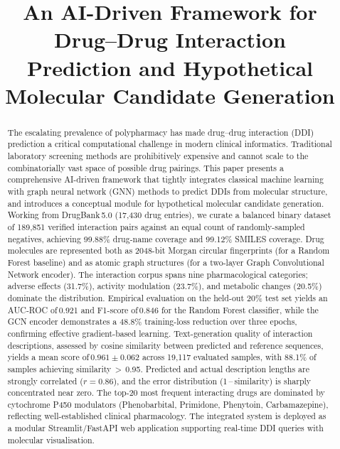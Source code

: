 \documentclass[conference]{IEEEtran}
\title{An AI-Driven Framework for Drug--Drug Interaction\\
Prediction and Hypothetical Molecular Candidate Generation}
\author{%
\IEEEauthorblockN{Ketan Tripathi,\enspace Amrit Lal Saket,\enspace
                  Prabhat Kumar Prince,\enspace Mehtab Singh Rathore}
\IEEEauthorblockA{%
  \textit{Guided by Dr.~Swapan Maiti, Assistant Professor}\\
  Department of Computer Science and Engineering\\
  Visvesvaraya National Institute of Technology (VNIT), Nagpur\,--\,440\,010, India
}}
\begin{document}
\maketitle

\begin{abstract}
The escalating prevalence of polypharmacy has made drug--drug interaction (DDI) prediction
a critical computational challenge in modern clinical informatics. Traditional laboratory
screening methods are prohibitively expensive and cannot scale to the combinatorially vast
space of possible drug pairings. This paper presents a comprehensive AI-driven framework
that tightly integrates classical machine learning with graph neural network (GNN) methods to
predict DDIs from molecular structure, and introduces a conceptual module for hypothetical
molecular candidate generation. Working from DrugBank\,5.0 (17,430 drug entries), we curate
a balanced binary dataset of 189,851 verified interaction pairs against an equal count of
randomly-sampled negatives, achieving 99.88\% drug-name coverage and 99.12\% SMILES
coverage. Drug molecules are represented both as 2048-bit Morgan circular fingerprints
(for a Random Forest baseline) and as atomic graph structures (for a two-layer Graph
Convolutional Network encoder). The interaction corpus spans nine pharmacological
categories; adverse effects (31.7\%), activity modulation (23.7\%), and metabolic changes
(20.5\%) dominate the distribution. Empirical evaluation on the held-out 20\% test set
yields an AUC-ROC of\,0.921 and F1-score of\,0.846 for the Random Forest classifier, while
the GCN encoder demonstrates a 48.8\% training-loss reduction over three epochs,
confirming effective gradient-based learning. Text-generation quality of interaction
descriptions, assessed by cosine similarity between predicted and reference sequences, yields
a mean score of\,$0.961 \pm 0.062$ across 19,117 evaluated samples, with 88.1\% of samples
achieving similarity\,$>$\,0.95. Predicted and actual description lengths are strongly
correlated ($r = 0.86$), and the error distribution (1\,--\,similarity) is sharply
concentrated near zero. The top-20 most frequent interacting drugs are dominated by
cytochrome P450 modulators (Phenobarbital, Primidone, Phenytoin, Carbamazepine), reflecting
well-established clinical pharmacology. The integrated system is deployed as a modular
Streamlit/FastAPI web application supporting real-time DDI queries with molecular
visualisation.
\end{abstract}
\end{document}
